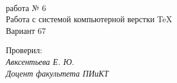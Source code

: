 

\maketitle

\vspace{10em}
\begin{center}
    {}\\
    \vspace{1em}
    { работа № 6}\\ 
    \vspace{1em}
    {\Large Работа с системой компьютерной верстки \TeX}\\
    \vspace{1em}
    {\Large Вариант 67}
\end{center}
\vspace{8em}
\begin{flushright}
{\large
Проверил:\\
\textit{Авксентьева Е. Ю.}\\
\textit{Доцент факультета ПИиКТ}}
\end{flushright}

